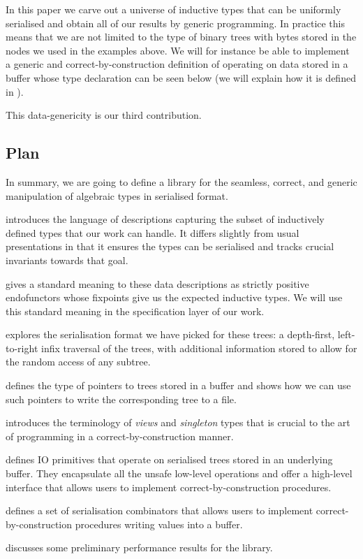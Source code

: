 In this paper we carve out a universe of inductive types that can be
uniformly serialised and obtain all of our results by generic programming.
%
In practice this means that we are not limited to the type of binary trees
with bytes stored in the nodes we used in the examples above.
%
We will for instance be able to implement
a generic and correct-by-construction
definition of  operating on data stored in a buffer
whose type declaration can be seen below
(we will explain how it is defined in ).

\begin{center}
  \begin{minipage}{.7\textwidth}
  \end{minipage}
\end{center}

This data-genericity is our third contribution.

\subsection{Plan}

In summary, we are going to define a library for the
seamless,
correct,
and generic
manipulation of algebraic types in serialised format.


 introduces the language of descriptions capturing the
subset of inductively defined types that our work can handle.
It differs slightly from usual presentations in that it ensures the
types can be serialised and tracks crucial invariants towards that goal.

 gives a standard meaning to these data descriptions
as strictly positive endofunctors whose fixpoints give us the expected
inductive types.
%
We will use this standard meaning in the specification layer of our work.

 explores the serialisation format we have picked
for these trees: a depth-first, left-to-right infix traversal of the
trees, with additional information stored to allow for the random access
of any subtree.

 defines the type of pointers to trees stored in a
buffer and shows how we can use such pointers to write the corresponding
tree to a file.

 introduces the terminology of \emph{views} and
\emph{singleton} types that is crucial to the art of programming
in a correct-by-construction manner.

 defines IO primitives that operate on serialised
trees stored in an underlying buffer.
%
They encapsulate all the unsafe low-level operations and offer a
high-level interface that allows users to implement correct-by-construction
procedures.

 defines a set of serialisation combinators that
allows users to implement correct-by-construction procedures writing
values into a buffer.

 discusses some preliminary performance results for
the library.
